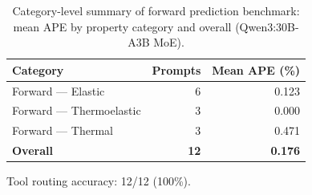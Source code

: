 \documentclass[preprint,review,10pt,number]{elsarticle}
\begin{document}
\begin{table}[htbp]
\centering
\caption{Category-level summary of forward prediction benchmark: mean APE by property category and overall (Qwen3:30B-A3B MoE).}
\label{tab:category_summary_mape}
\begin{tabular}{lrr}
\toprule
\textbf{Category} & \textbf{Prompts} & \textbf{Mean APE (\%)} \\
\midrule
Forward --- Elastic       & 6  & 0.123 \\
Forward --- Thermoelastic & 3  & 0.000 \\
Forward --- Thermal       & 3  & 0.471 \\
\midrule
\textbf{Overall}          & \textbf{12} & \textbf{0.176} \\
\bottomrule
\end{tabular}

\vspace{4pt}
\footnotesize Tool routing accuracy: 12/12 (100\%).
\end{table}
\end{document}
